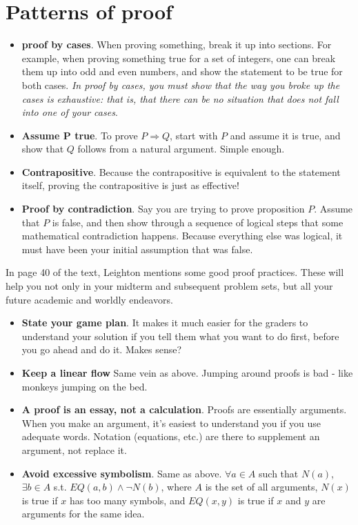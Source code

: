 \documentclass[11pt]{article}
\begin{document}
\section{Patterns of proof}
\begin{itemize}
	\item \textbf{proof by cases}.  When proving something, break it up into sections.  For example, when proving something true for a set of integers, one can break them up into odd and even numbers, and show the statement to be true for both cases.  \emph{In proof by cases, you must show that the way you broke up the cases is exhaustive: that is, that there can be no situation that does not fall into one of your cases}.
	
	\item \textbf{Assume P true}.  To prove $P \Rightarrow Q$, start with $P$ and assume it is true, and show that $Q$ follows from a natural argument.  Simple enough.
	\item \textbf{Contrapositive}.  Because the contrapositive is equivalent to the statement itself, proving the contrapositive is just as effective!
	\item \textbf{Proof by contradiction}.  Say you are trying to prove proposition $P$.  Assume that $P$ is false, and then show through a sequence of logical steps that some mathematical contradiction happens.  Because everything else was logical, it must have been your initial assumption that was false.  


\end{itemize}

In page 40 of the text, Leighton mentions some good proof practices.  These will help you not only in your midterm and subsequent problem sets, but all your future academic and worldly endeavors.

\begin{itemize}
	\item \textbf{ State your game plan}.  It makes it much easier for the  graders to understand your solution if you tell them what you want to do first, before you go ahead and do it.  Makes sense?
	
	\item \textbf{ Keep a linear flow} Same vein as above.  Jumping around proofs is bad - like monkeys jumping on the bed.
	
	\item \textbf{ A proof is an essay, not a calculation}.  Proofs are essentially arguments.  When you make an argument, it's easiest to understand you if you use adequate words.  Notation (equations, etc.) are there to supplement an argument, not replace it.
	\item \textbf{Avoid excessive symbolism}.  Same as above.  $\forall a \in A$ such that 
	$N(a)$, $\exists b \in A$ s.t. $EQ(a, b) \wedge \neg N(b)$, where $A$ is the set of all arguments, $N(x)$ is true if $x$ has too many symbols, and $EQ(x,y)$ is true if $x$ and $y$ are arguments for the same idea. 
\end{itemize}
\end{document}
